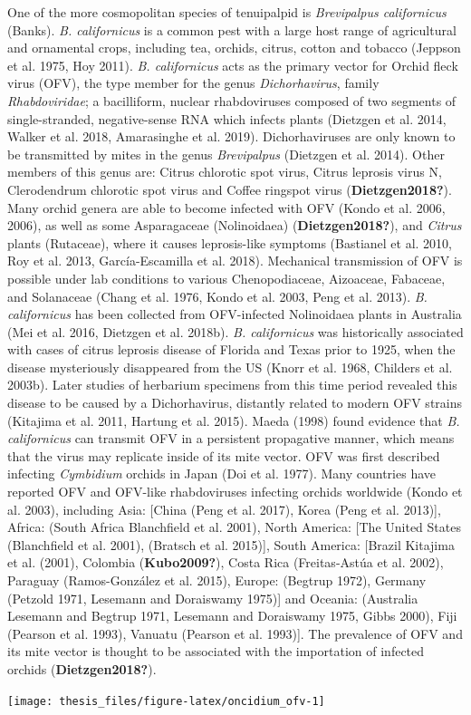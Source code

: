\documentclass[12pt,final,CPage]{ufthesis}
\begin{document}
{  One of the more cosmopolitan species of tenuipalpid is \emph{Brevipalpus californicus} (Banks). \emph{B. californicus} is a common pest with a large host range of agricultural and ornamental crops, including tea, orchids, citrus, cotton and tobacco (Jeppson et al. 1975, Hoy 2011). \emph{B. californicus} acts as the primary vector for Orchid fleck virus (OFV), the type member for the genus \emph{Dichorhavirus}, family \emph{Rhabdoviridae}; a bacilliform, nuclear rhabdoviruses composed of two segments of single-stranded, negative-sense RNA which infects plants (Dietzgen et al. 2014, Walker et al. 2018, Amarasinghe et al. 2019). Dichorhaviruses are only known to be transmitted by mites in the genus \emph{Brevipalpus} (Dietzgen et al. 2014). Other members of this genus are: Citrus chlorotic spot virus, Citrus leprosis virus N, Clerodendrum chlorotic spot virus and Coffee ringspot virus (\textbf{Dietzgen2018?}). Many orchid genera are able to become infected with OFV (Kondo et al. 2006, 2006), as well as some Asparagaceae (Nolinoidaea) (\textbf{Dietzgen2018?}), and \emph{Citrus} plants (Rutaceae), where it causes leprosis-like symptoms (Bastianel et al. 2010, Roy et al. 2013, García-Escamilla et al. 2018). Mechanical transmission of OFV is possible under lab conditions to various Chenopodiaceae, Aizoaceae, Fabaceae, and Solanaceae (Chang et al. 1976, Kondo et al. 2003, Peng et al. 2013). \emph{B. californicus} has been collected from OFV-infected Nolinoidaea plants in Australia (Mei et al. 2016, Dietzgen et al. 2018b). \emph{B. californicus} was historically associated with cases of citrus leprosis disease of Florida and Texas prior to 1925, when the disease mysteriously disappeared from the US (Knorr et al. 1968, Childers et al. 2003b). Later studies of herbarium specimens from this time period revealed this disease to be caused by a Dichorhavirus, distantly related to modern OFV strains (Kitajima et al. 2011, Hartung et al. 2015). Maeda (1998) found evidence that \emph{B. californicus} can transmit OFV in a persistent propagative manner, which means that the virus may replicate inside of its mite vector. OFV was first described infecting \emph{Cymbidium} orchids in Japan (Doi et al. 1977). Many countries have reported OFV and OFV-like rhabdoviruses infecting orchids worldwide (Kondo et al. 2003), including Asia: {[}China (Peng et al. 2017), Korea (Peng et al. 2013){]}, Africa: (South Africa Blanchfield et al. 2001), North America: {[}The United States (Blanchfield et al. 2001), (Bratsch et al. 2015){]}, South America: {[}Brazil Kitajima et al. (2001), Colombia (\textbf{Kubo2009?}), Costa Rica (Freitas-Astúa et al. 2002), Paraguay (Ramos-González et al. 2015), Europe: (Begtrup 1972), Germany (Petzold 1971, Lesemann and Doraiswamy 1975){]} and Oceania: (Australia Lesemann and Begtrup 1971, Lesemann and Doraiswamy 1975, Gibbs 2000), Fiji (Pearson et al. 1993), Vanuatu (Pearson et al. 1993){]}. The prevalence of OFV and its mite vector is thought to be associated with the importation of infected orchids (\textbf{Dietzgen2018?}).
  \begin{center}\texttt{[image: thesis\_files/figure-latex/oncidium\_ofv-1]} \end{center}

}
\end{document}
